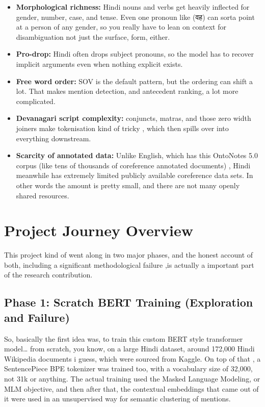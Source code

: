 \documentclass[12pt,a4paper]{report}
\begin{document}
\begin{itemize}
    \item \textbf{Morphological richness:} Hindi nouns and verbs get heavily inflected for gender, number, case, and tense. Even one pronoun like ({\hindifont वह}) can sorta point at a person of any gender, so you really have to lean on context for disambiguation not just the surface, form, either.

    \item \textbf{Pro-drop:} Hindi often drops subject pronouns, so the model has to recover implicit arguments even when nothing explicit exists.  

    \item \textbf{Free word order:} SOV is the default pattern, but the ordering can shift a lot. That makes mention detection, and antecedent ranking, a lot more complicated.
    
    \item \textbf{Devanagari script complexity:} conjuncts, matras, and those zero width joiners make tokenisation kind of tricky , which then spills over into everything downstream.
    
    \item \textbf{Scarcity of annotated data:} Unlike English, which has this OntoNotes 5.0 corpus (like tens of thousands of coreference annotated documents) , Hindi meanwhile has extremely limited publicly available coreference data sets. In other words the amount is pretty small, and there are not many openly shared resources.
\end{itemize}

\section{Project Journey Overview}

This project kind of went along in two major phases, and the honest account of both, including a significant methodological failure ,is actually a important part of the research contribution.

\subsection{Phase 1: Scratch BERT Training (Exploration and Failure)}

So, basically the first idea was, to train this custom BERT style transformer model… from scratch, you know, on a large Hindi dataset, around 172,000 Hindi Wikipedia documents i guess, which were sourced from Kaggle. On top of that , a SentencePiece BPE tokenizer was trained too, with a vocabulary size of 32,000, not 31k or anything. The actual training used the Masked Language Modeling, or MLM objective, and then after that, the contextual embeddings that came out of it were used in an unsupervised way for semantic clustering of mentions.
\end{document}
